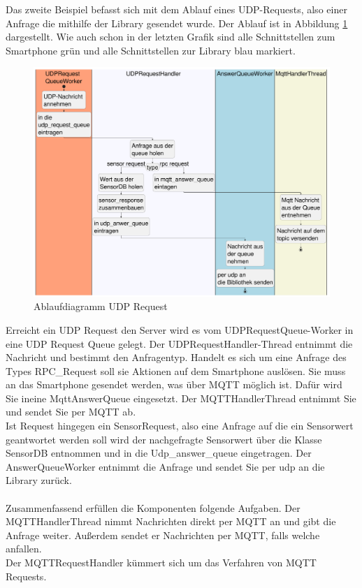 \documentclass[11pt,a4paper]{report}
\begin{document}
Das zweite Beispiel befasst sich mit dem Ablauf eines UDP-Requests, also einer Anfrage die mithilfe der Library gesendet wurde.
Der Ablauf ist in Abbildung \ref{fig:serverUDPReqPath} dargestellt.
Wie auch schon in der letzten Grafik sind alle Schnittstellen zum Smartphone grün und alle Schnittstellen zur Library blau markiert.
\begin{figure}[htbp]
  \centering
  \includegraphics[width=.8\textwidth]{images/UDPRequestServerPath}
  \caption{Ablaufdiagramm UDP Request}
  \label{fig:serverUDPReqPath}
\end{figure}
Erreicht ein UDP Request den Server wird es vom UDPRequestQueue-Worker in eine UDP Request Queue gelegt.
Der UDPRequestHandler-Thread entnimmt die Nachricht und bestimmt den Anfragentyp.
Handelt es sich um eine Anfrage des Types RPC\_Request soll sie Aktionen auf dem Smartphone auslösen.
Sie muss an das Smartphone gesendet werden, was über MQTT möglich ist.
Dafür wird Sie ineine MqttAnswerQueue eingesetzt.
Der MQTTHandlerThread entnimmt Sie und sendet Sie per MQTT ab.
\\
Ist Request hingegen ein SensorRequest, also eine Anfrage auf die ein Sensorwert geantwortet werden soll wird der nachgefragte Sensorwert über die Klasse SensorDB entnommen und in die Udp\_answer\_queue eingetragen.
Der AnswerQueueWorker entnimmt die Anfrage und sendet Sie per udp an die Library zurück.
\\\\
Zusammenfassend erfüllen die Komponenten folgende Aufgaben.
Der MQTTHandlerThread nimmt Nachrichten direkt per MQTT an und gibt die Anfrage weiter.
Außerdem sendet er Nachrichten per MQTT, falls welche anfallen.
\\
Der MQTTRequestHandler kümmert sich um das Verfahren von MQTT Requests.
\end{document}
